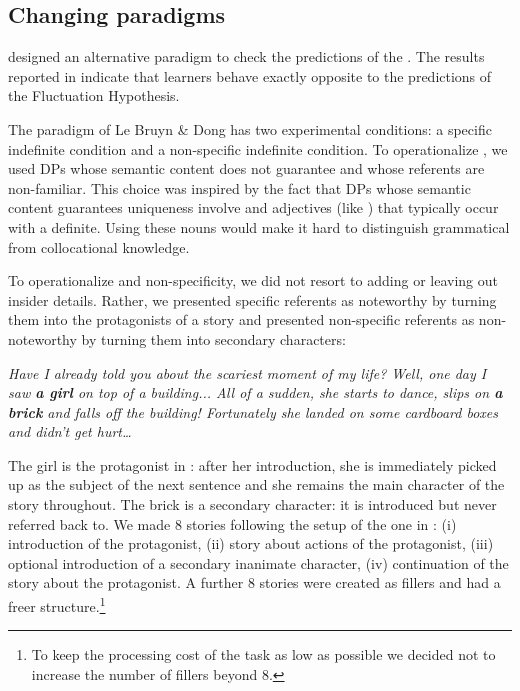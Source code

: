 \documentclass[output=paper,
modfonts
]{langscibook}
\begin{document}
\subsection{Changing paradigms}

\citet{LeBruynDong2017S} designed an alternative paradigm to check the predictions of the . The results reported in \citet{LeBruynDong2017T} indicate that  learners behave exactly opposite to the predictions of the Fluctuation Hypothesis.

The paradigm of Le Bruyn \& Dong has two experimental conditions: a specific indefinite condition and a non-specific indefinite condition. To operationalize , we used DPs whose semantic content does not guarantee  and whose referents are non-familiar. This choice was inspired by the fact that DPs whose semantic content guarantees uniqueness involve  and adjectives (like ) that typically occur with a definite. Using these nouns would make it hard to distinguish grammatical from collocational knowledge.

To operationalize  and non-specificity, we did not resort to adding or leaving out insider details. Rather, we presented specific referents as noteworthy by turning them into the protagonists of a story and presented non-specific referents as non-noteworthy by turning them into secondary characters:

\ea\label{ex:lebruyn:3}

\textit{Have I already told you about the scariest moment of my life? Well, one day I saw \textbf{a girl} on top of a building... All of a sudden, she starts to dance, slips on \textbf{a brick} and falls off the	building! Fortunately she landed on some cardboard boxes and didn’t get hurt…}

\z

The girl is the protagonist in : after her introduction, she is immediately picked up as the subject of the next sentence and she remains the main character of the story throughout. The brick is a secondary character: it is introduced but never referred back to. We made 8 stories following the setup of the one in : (i) introduction of the protagonist, (ii) story about actions of the protagonist, (iii) optional introduction of a secondary inanimate character, (iv) continuation of the story about the protagonist. A further 8 stories were created as fillers and had a freer structure.\footnote{To keep the processing cost of the task as low as possible we decided not to increase the number of fillers beyond 8.}
\end{document}

